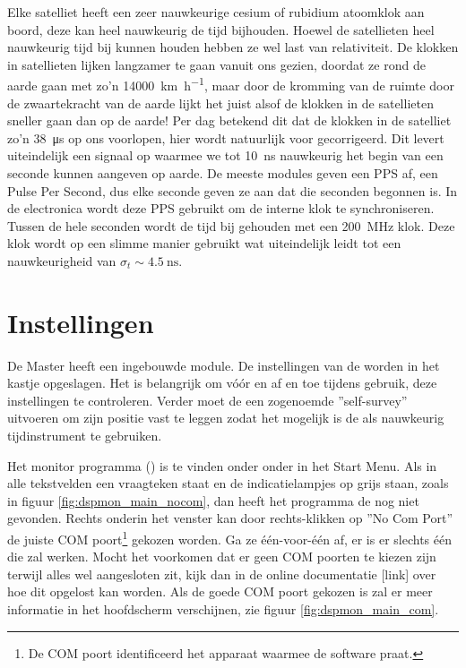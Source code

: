 Elke \gps satelliet heeft een zeer nauwkeurige cesium of rubidium
atoomklok aan boord, deze kan heel nauwkeurig de tijd bijhouden. Hoewel
de \gps satellieten heel nauwkeurig tijd bij kunnen houden hebben ze wel last
van relativiteit. De klokken in \gps satellieten lijken langzamer te gaan
vanuit ons gezien, doordat ze rond de aarde gaan met zo'n
\SI{14000}{\kilo\meter\per\hour}, maar door de kromming van de ruimte
door de zwaartekracht van de aarde lijkt het juist alsof de klokken in de
\gps satellieten sneller gaan dan op de aarde! Per dag betekend dit dat
de klokken in de satelliet zo'n \SI{38}{\micro\second} op ons voorlopen,
hier wordt natuurlijk voor gecorrigeerd. Dit levert uiteindelijk een
signaal op waarmee we tot \SI{10}{\nano\second} nauwkeurig het begin van
een seconde kunnen aangeven op aarde. De meeste \gps modules geven een
PPS af, een Pulse Per Second, dus elke seconde geven ze aan dat die
seconden begonnen is. In de \hisparc electronica wordt deze PPS gebruikt
om de interne klok te synchroniseren. Tussen de hele seconden wordt de
tijd bij gehouden met een \SI{200}{\mega\hertz} klok. Deze klok wordt op
een slimme manier gebruikt wat uiteindelijk leidt tot een nauwkeurigheid
van $\sigma_t\sim\SI{4.5}{\nano\second}$.


\section{Instellingen}

De \hisparc Master heeft een ingebouwde \gps module. De instellingen van
de \gps worden in het kastje opgeslagen. Het is belangrijk om vóór en af
en toe tijdens gebruik, deze instellingen te controleren. Verder moet de
\gps een zogenoemde ''self-survey'' uitvoeren om zijn positie vast te
leggen zodat het mogelijk is de \gps als nauwkeurig tijdinstrument te
gebruiken.

Het \gps monitor programma (\dspmon) is te vinden onder onder \hisparc
in het Start Menu. Als in alle tekstvelden een vraagteken staat en de
indicatielampjes op grijs staan, zoals in figuur \ref{fig:dspmon_main_nocom}, dan heeft
het programma de \gps nog niet gevonden. Rechts onderin het venster kan
door rechts-klikken op ''No Com Port'' de juiste COM poort\footnote{De
COM poort identificeerd het apparaat waarmee de software praat.} gekozen
worden. Ga ze één-voor-één af, er is er slechts één die zal werken.
Mocht het voorkomen dat er geen COM poorten te kiezen zijn terwijl alles
wel aangesloten zit, kijk dan in de online documentatie [link] over hoe
dit opgelost kan worden. Als de goede COM poort gekozen is zal er meer
informatie in het hoofdscherm verschijnen, zie figuur
\ref{fig:dspmon_main_com}.

